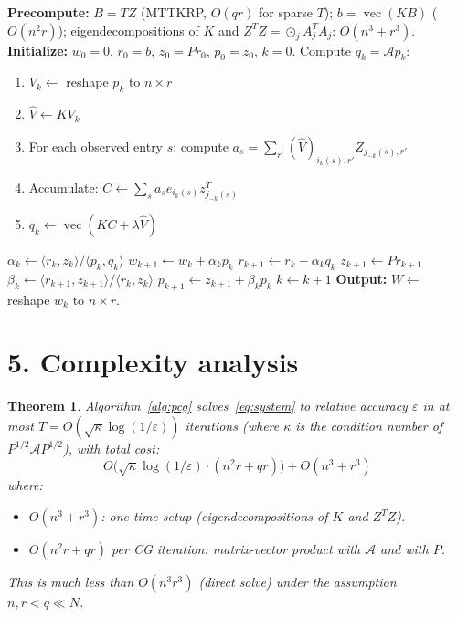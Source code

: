 \documentclass[12pt]{article}
\newtheorem{theorem}{Theorem}
\DeclareMathOperator{\vecop}{vec}
\begin{document}
\begin{algorithm}
\caption{Preconditioned CG for RKHS-CP mode-$k$ subproblem}
\label{alg:pcg}
\begin{algorithmic}[1]
  \State \textbf{Precompute:} $B = TZ$ (MTTKRP, $O(qr)$ for sparse $T$); $b = \vecop(KB)$ ($O(n^2 r)$);
  \State \quad eigendecompositions of $K$ and $Z^TZ = \odot_j A_j^TA_j$: $O(n^3 + r^3)$.
  \State \textbf{Initialize:} $w_0 = 0$, $r_0 = b$, $z_0 = Pr_0$, $p_0 = z_0$, $k=0$.
    \State Compute $q_k = \mathcal{A}p_k$: 
      \begin{enumerate}
        \item $V_k \leftarrow$ reshape $p_k$ to $n\times r$
        \item $\hat{V} \leftarrow KV_k$ 
        \item For each observed entry $s$: compute $a_s = \sum_{r'}(\hat{V})_{i_k(s),r'} Z_{j_{-k}(s),r'}$ 
        \item Accumulate: $C \leftarrow \sum_s a_s e_{i_k(s)} z_{j_{-k}(s)}^T$ 
        \item $q_k \leftarrow \vecop(KC + \lambda \hat{V})$ 
      \end{enumerate}
    \State $\alpha_k \leftarrow \langle r_k, z_k\rangle / \langle p_k, q_k\rangle$
    \State $w_{k+1} \leftarrow w_k + \alpha_k p_k$
    \State $r_{k+1} \leftarrow r_k - \alpha_k q_k$
    \State $z_{k+1} \leftarrow P r_{k+1}$ 
    \State $\beta_k \leftarrow \langle r_{k+1}, z_{k+1}\rangle / \langle r_k, z_k\rangle$
    \State $p_{k+1} \leftarrow z_{k+1} + \beta_k p_k$
    \State $k \leftarrow k+1$
  \EndWhile
  \State \textbf{Output:} $W \leftarrow$ reshape $w_k$ to $n\times r$.
\end{algorithmic}
\end{algorithm}

\section*{5. Complexity analysis}

\begin{theorem}
  \label{thm:complexity}
  Algorithm~\ref{alg:pcg} solves~\eqref{eq:system} to relative accuracy $\varepsilon$ in at most $T = O(\sqrt{\kappa}\log(1/\varepsilon))$ iterations (where $\kappa$ is the condition number of $P^{1/2}\mathcal{A}P^{1/2}$), with total cost:
  \[
    O\!\bigl(\sqrt{\kappa}\log(1/\varepsilon)\cdot(n^2 r + qr)\bigr) + O(n^3 + r^3)
  \]
  where:
  \begin{itemize}
    \item $O(n^3 + r^3)$: one-time setup (eigendecompositions of $K$ and $Z^TZ$).
    \item $O(n^2 r + qr)$ per CG iteration: matrix-vector product with $\mathcal{A}$ and with $P$.
  \end{itemize}
  This is much less than $O(n^3 r^3)$ (direct solve) under the assumption $n, r < q \ll N$.
\end{theorem}
\end{document}
